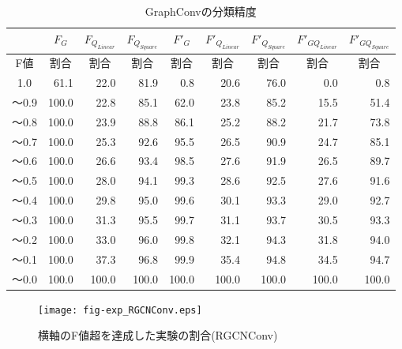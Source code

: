 \begin{table*}[tb]
\caption{GraphConvの分類精度}\label{tbl:result_graphconv}
\centering
\begin{tabular}{|c|r|r|r|r|r|r|r|r|}\hline
  & \multicolumn{1}{|c|}{$F_{G}$} & \multicolumn{1}{|c|}{$F_{Q_{Linear}}$} & \multicolumn{1}{|c|}{$F_{Q_{Square}}$} & \multicolumn{1}{|c|}{$F'_{G}$} & \multicolumn{1}{|c|}{${F'}_{Q_{Linear}}$} & \multicolumn{1}{|c|}{${F'}_{Q_{Square}}$} & \multicolumn{1}{|c|}{${F'}_{GQ_{Linear}}$} & \multicolumn{1}{|c|}{${F'}_{GQ_{Square}}$}\\
  \hline
  \multicolumn{1}{|c|}{F値} & \multicolumn{1}{|c|}{割合} & \multicolumn{1}{|c|}{割合} & \multicolumn{1}{|c|}{割合} & \multicolumn{1}{|c|}{割合} & \multicolumn{1}{|c|}{割合} & \multicolumn{1}{|c|}{割合} & \multicolumn{1}{|c|}{割合} & \multicolumn{1}{|c|}{割合} \\
  \hline
  1.0   & 61.1 & 22.0 & 81.9 & 0.8 & 20.6 & 76.0 & 0.0 & 0.8 \\
  〜0.9 & 100.0 & 22.8 & 85.1 & 62.0 & 23.8 & 85.2 & 15.5 & 51.4 \\
  〜0.8 & 100.0 & 23.9 & 88.8 & 86.1 & 25.2 & 88.2 & 21.7 & 73.8 \\
  〜0.7 & 100.0 & 25.3 & 92.6 & 95.5 & 26.5 & 90.9 & 24.7 & 85.1 \\
  〜0.6 & 100.0 & 26.6 & 93.4 & 98.5 & 27.6 & 91.9 & 26.5 & 89.7 \\
  〜0.5 & 100.0 & 28.0 & 94.1 & 99.3 & 28.6 & 92.5 & 27.6 & 91.6 \\
  〜0.4 & 100.0 & 29.8 & 95.0 & 99.6 & 30.1 & 93.3 & 29.0 & 92.7 \\
  〜0.3 & 100.0 & 31.3 & 95.5 & 99.7 & 31.1 & 93.7 & 30.5 & 93.3 \\
  〜0.2 & 100.0 & 33.0 & 96.0 & 99.8 & 32.1 & 94.3 & 31.8 & 94.0 \\
  〜0.1 & 100.0 & 37.3 & 96.8 & 99.9 & 35.4 & 94.8 & 34.5 & 94.7 \\
  〜0.0 & 100.0 & 100.0 & 100.0 & 100.0 & 100.0 & 100.0 & 100.0 & 100.0 \\
  \hline
\end{tabular}
\end{table*}

\begin{figure*}[tb]
  \centering
  \texttt{[image: fig-exp\_RGCNConv.eps]}
  \caption{横軸のF値超を達成した実験の割合(RGCNConv)}\label{fig:result_rgcnconv}
\end{figure*}

